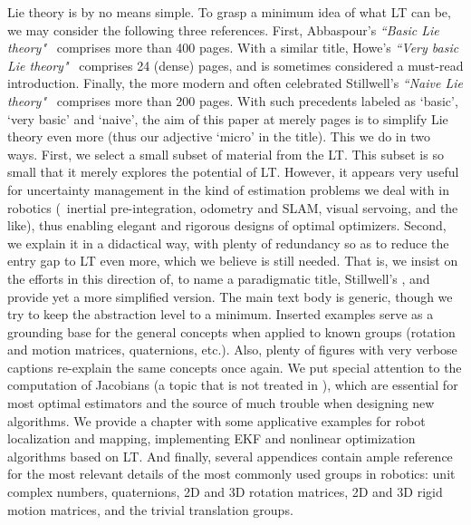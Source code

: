 Lie theory is by no means simple. 
To grasp a minimum idea of what LT can be, we may consider the following three references. 
First, Abbaspour's \emph{``Basic Lie theory"}~\cite{ABBASPOUR-2007-Basic_Lie_theory} comprises more than 400 pages.
With a similar title, Howe's \emph{``Very basic Lie theory"}~\cite{Howe-Basic_Lie} comprises 24 (dense) pages, and is sometimes considered a must-read introduction. 
Finally, the more modern and often celebrated Stillwell's \emph{``Naive Lie theory"}~\cite{STILLWELL-08} comprises more than 200 pages. 
%
With such precedents labeled as `basic', `very basic' and `naive', the aim of this paper at merely \pageref{LastPage} pages is to simplify Lie theory even more (thus our adjective `micro' in the title).
This we do in two ways. 
First, we select a small subset of material from the LT. This subset is so small that it merely explores the potential of LT. 
However, it appears very useful for uncertainty management in the kind of estimation problems we deal with in robotics (\eg~inertial pre-integration, odometry and SLAM, visual servoing, and the like), thus enabling elegant and rigorous designs of optimal optimizers.
Second, we explain it in a didactical way, with plenty of redundancy so as to reduce the entry gap to LT even more, which we believe is still needed.
That is, we insist on the efforts in this direction of, to name a paradigmatic title, Stillwell's \cite{STILLWELL-08}, and provide yet a more simplified version.
The main text body is generic, though we try to keep the abstraction level to a minimum.
Inserted examples serve as a grounding base for the general concepts when applied to known groups (rotation and motion matrices, quaternions, etc.). 
Also, plenty of figures with very verbose captions re-explain the same concepts once again. 
We put special attention to the computation of Jacobians (a topic that is not treated in \cite{STILLWELL-08}), which are essential for most optimal estimators and the source of much trouble when designing new algorithms.
We provide a chapter with some applicative examples for robot localization and mapping, implementing EKF and nonlinear optimization algorithms based on LT.
And finally, several appendices contain ample reference for the most relevant details of the most commonly used groups in robotics: unit complex numbers, quaternions, 2D and 3D rotation matrices, 2D and 3D rigid motion matrices, and the trivial translation groups.

